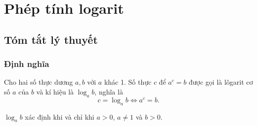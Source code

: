 \section{Phép tính logarit}
\subsection{Tóm tắt lý thuyết}
\begin{tomtat}
	\subsubsection{Định nghĩa}
	\begin{dn}
		Cho hai số thực dương $a, b$ với $a$ khác 1. Số thực $c$ để $a^{c}=b$ được gọi là lôgarit cơ số $a$ của $b$ và kí hiệu là $\log _{a} b$, nghĩa là
		$$c=\log _{a} b \Leftrightarrow a^{c}=b.$$
	\end{dn}
	\begin{note}
		$\log _{a} b$ xác định khi và chỉ khi $a>0$, $a \neq 1$ và $b>0$.
	\end{note}

\end{tomtat}
